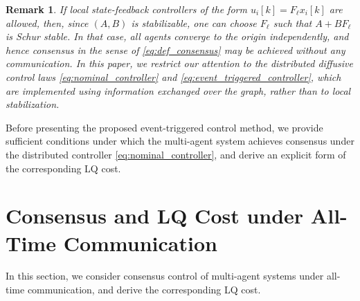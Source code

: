 \documentclass[letterpaper,10pt,conference]{ieeeconf}
\newtheorem{remark}{Remark}
\begin{document}
\begin{remark} \label{rem:local_stabilization}
  If local state-feedback controllers of the form $u_i[k] = F_\ell x_i[k]$ are allowed, then, since $(A,B)$ is stabilizable, one can choose $F_\ell$ such that $A+BF_\ell$ is Schur stable.
  In that case, all agents converge to the origin independently, and hence consensus in the sense of \eqref{eq:def_consensus} may be achieved without any communication.
  In this paper, we restrict our attention to the distributed diffusive control laws \eqref{eq:nominal_controller} and \eqref{eq:event_triggered_controller}, which are implemented using information exchanged over the graph, rather than to local stabilization.
\end{remark}

Before presenting the proposed event-triggered control method, we provide sufficient conditions under which the multi-agent system achieves consensus under the distributed controller \eqref{eq:nominal_controller}, and derive an explicit form of the corresponding LQ cost.

\section{Consensus and LQ Cost under All-Time Communication}
\label{sec:standard_consensus}

In this section, we consider consensus control of multi-agent systems under all-time communication, and derive the corresponding LQ cost.
\end{document}
